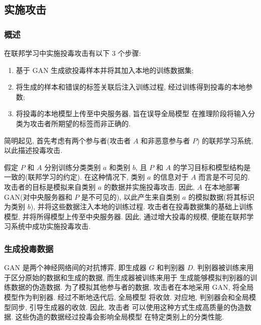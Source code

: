 \documentclass[../main.tex]{subfiles}
\begin{document}
\subsection{实施攻击}
\subsubsection{概述}
在联邦学习中实施投毒攻击有以下 $ 3 $ 个步骤:
\begin{enumerate}
  \item 基于 GAN 生成欲投毒样本并将其加入本地的训练数据集;
  \item 将生成的样本和错误的标签关联后注入训练过程,
    经过训练得到投毒的本地参数;
  \item 将投毒的本地模型上传至中央服务器, 旨在误导全局模型
    在推理阶段将输入分类为攻击者所期望的标签而非正确的.
\end{enumerate}
%
简明起见, 首先考虑有两个参与者(攻击者 $ A $ 和非恶意参与者 $ P $)
的联邦学习系统, 以此描述投毒攻击.

假定 $ P $ 和 $ A $ 分别训练分类类别 $ a $ 和类别 $ b $, 且 $ P $ 和
$ A $ 的学习目标和模型结构是一致的(联邦学习的约定).
在这种情况下, 类别 $ a $ 的信息对于 $ A $ 而言是不可见的.
攻击者的目标是模拟来自类别 $ a $ 的数据并实施投毒攻击.
因此, $ A $ 在本地部署 GAN(对中央服务器和 $ P $ 是不可见的),
以此产生来自类别 $ a $ 的模拟数据(将其标识为类别 $ b $), 并将这些数据注入本地的训练过程.
攻击者在投毒数据集的基础上训练模型, 并将所得模型上传至中央服务器.
因此, 通过增大投毒的规模, 便能在联邦学习系统中成功实施投毒攻击.
%
\subsubsection{生成投毒数据}
GAN 是两个神经网络间的对抗博弈, 即生成器 $ G $ 和判别器 $ D $.
判别器被训练来用于区分原始的数据和生成的数据, 而生成器被训练来用于
生成能够模拟判别器的训练数据的伪造数据. 为了模拟其他参与者的数据,
攻击者在本地采用 GAN, 将全局模型作为判别器. 经过不断地迭代后, 全局模型
将收敛. 对应地, 判别器会和全局模型同步, 引导生成器的收敛. 因此, 攻击者
可以使用这种方式生成高质量的伪造数据. 这些伪造的数据经过投毒会影响全局模型
在特定类别上的分类性能.
\end{document}
